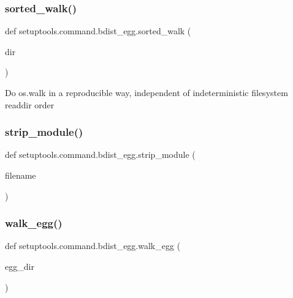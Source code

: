 \subsubsection{\texorpdfstring{sorted\+\_\+walk()}{sorted\_walk()}}
{\footnotesize\ttfamily def setuptools.\+command.\+bdist\+\_\+egg.\+sorted\+\_\+walk (\begin{DoxyParamCaption}\item[{}]{dir }\end{DoxyParamCaption})}

\begin{DoxyVerb}Do os.walk in a reproducible way,
independent of indeterministic filesystem readdir order
\end{DoxyVerb}
 \mbox{\label{namespacesetuptools_1_1command_1_1bdist__egg_a2a58a1997d8099deae92ca117efa2bc0}} 
\subsubsection{\texorpdfstring{strip\+\_\+module()}{strip\_module()}}
{\footnotesize\ttfamily def setuptools.\+command.\+bdist\+\_\+egg.\+strip\+\_\+module (\begin{DoxyParamCaption}\item[{}]{filename }\end{DoxyParamCaption})}

\mbox{\label{namespacesetuptools_1_1command_1_1bdist__egg_ac8cbe5e3bca6f6a198d15421a238c141}} 
\subsubsection{\texorpdfstring{walk\+\_\+egg()}{walk\_egg()}}
{\footnotesize\ttfamily def setuptools.\+command.\+bdist\+\_\+egg.\+walk\+\_\+egg (\begin{DoxyParamCaption}\item[{}]{egg\+\_\+dir }\end{DoxyParamCaption})}


